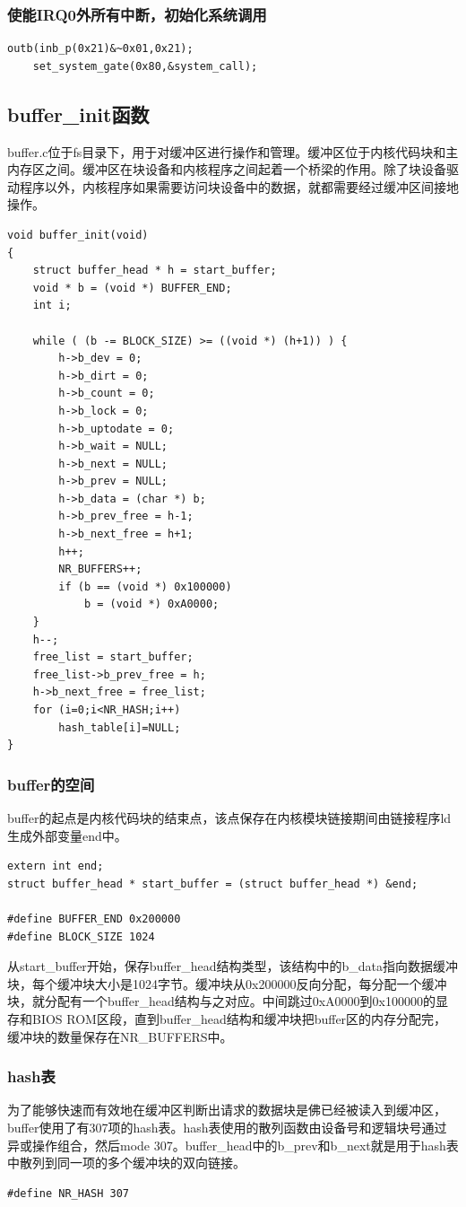 \documentclass[12pt]{article}
\begin{document}
\subsubsection{使能IRQ0外所有中断，初始化系统调用}
\begin{lstlisting}[breaklines]
	outb(inb_p(0x21)&~0x01,0x21);
	set_system_gate(0x80,&system_call);
\end{lstlisting}	
\subsection{buffer\_init函数}
buffer.c位于fs目录下，用于对缓冲区进行操作和管理。缓冲区位于内核代码块和主内存区之间。缓冲区在块设备和内核程序之间起着一个桥梁的作用。除了块设备驱动程序以外，内核程序如果需要访问块设备中的数据，就都需要经过缓冲区间接地操作。
\begin{lstlisting}[breaklines]
void buffer_init(void)
{
	struct buffer_head * h = start_buffer;
	void * b = (void *) BUFFER_END;
	int i;

	while ( (b -= BLOCK_SIZE) >= ((void *) (h+1)) ) {
		h->b_dev = 0;
		h->b_dirt = 0;
		h->b_count = 0;
		h->b_lock = 0;
		h->b_uptodate = 0;
		h->b_wait = NULL;
		h->b_next = NULL;
		h->b_prev = NULL;
		h->b_data = (char *) b;
		h->b_prev_free = h-1;
		h->b_next_free = h+1;
		h++;
		NR_BUFFERS++;
		if (b == (void *) 0x100000)
			b = (void *) 0xA0000;
	}
	h--;
	free_list = start_buffer;
	free_list->b_prev_free = h;
	h->b_next_free = free_list;
	for (i=0;i<NR_HASH;i++)
		hash_table[i]=NULL;
}	
\end{lstlisting}	
\subsubsection{buffer的空间}
buffer的起点是内核代码块的结束点，该点保存在内核模块链接期间由链接程序ld生成外部变量end中。
\begin{lstlisting}[breaklines]
extern int end;
struct buffer_head * start_buffer = (struct buffer_head *) &end;

#define BUFFER_END 0x200000
#define BLOCK_SIZE 1024
\end{lstlisting}	
从start\_buffer开始，保存buffer\_head结构类型，该结构中的b\_data指向数据缓冲块，每个缓冲块大小是1024字节。缓冲块从0x200000反向分配，每分配一个缓冲块，就分配有一个buffer\_head结构与之对应。中间跳过0xA0000到0x100000的显存和BIOS ROM区段，直到buffer\_head结构和缓冲块把buffer区的内存分配完，缓冲块的数量保存在NR\_BUFFERS中。
\subsubsection{hash表}
为了能够快速而有效地在缓冲区判断出请求的数据块是佛已经被读入到缓冲区，buffer使用了有307项的hash表。hash表使用的散列函数由设备号和逻辑块号通过异或操作组合，然后mode 307。buffer\_head中的b\_prev和b\_next就是用于hash表中散列到同一项的多个缓冲块的双向链接。
\begin{lstlisting}[breaklines]
#define NR_HASH 307
\end{lstlisting}	
\end{document}
